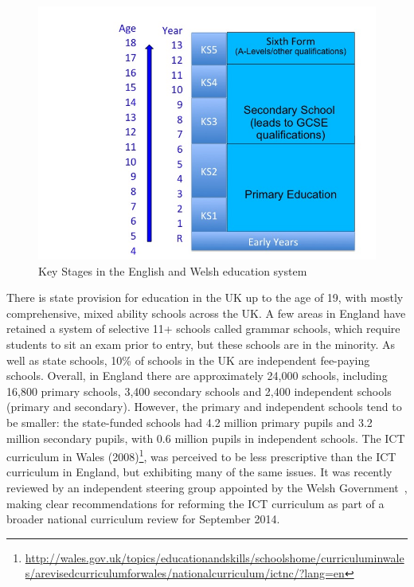 \documentclass{sig-alternate}
\begin{document}
\begin{figure}
  \centering
  \includegraphics[width=\columnwidth]{images/key-stages.png}
  \caption{Key Stages in the English and Welsh education system}
  \label{fig:key-stages}
\end{figure}

There is state provision for education in the UK up to the age of 19,
with mostly comprehensive, mixed ability schools across the UK. A few
areas in England have retained a system of selective 11+ schools
called grammar schools, which require students to sit an exam prior to
entry, but these schools are in the minority. As well as state
schools, 10\% of schools in the UK are independent fee-paying
schools. Overall, in England there are approximately 24,000 schools,
including 16,800 primary schools, 3,400 secondary schools and 2,400
independent schools (primary and secondary).  However, the primary and
independent schools tend to be smaller: the state-funded schools had
4.2 million primary pupils and 3.2 million secondary pupils, with 0.6
million pupils in independent schools. The ICT
curriculum in Wales
(2008)\footnote{\url{http://wales.gov.uk/topics/educationandskills/schoolshome/curriculuminwales/arevisedcurriculumforwales/nationalcurriculum/ictnc/?lang=en}},
was perceived to be less prescriptive than the ICT curriculum in
England, but exhibiting many of the same issues. It was recently
reviewed by an independent steering group appointed by the Welsh
Government~\cite{welshictreview:2013}, making clear recommendations for
reforming the ICT curriculum as part of a broader national curriculum
review for September 2014.
\end{document}
